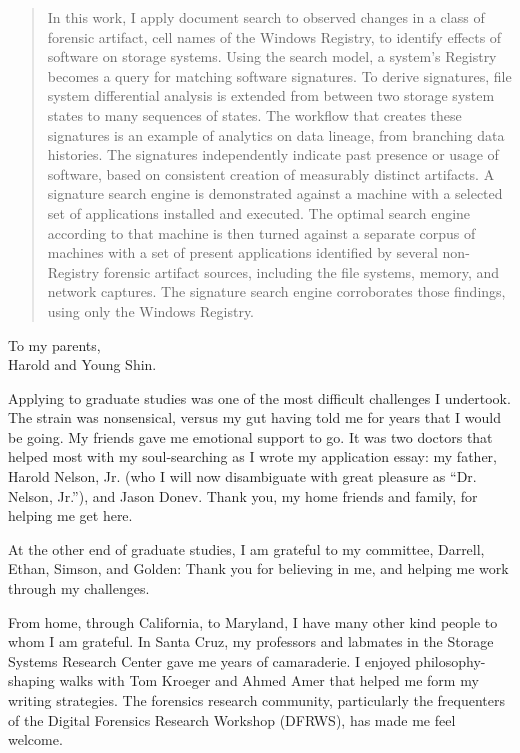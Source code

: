 \documentclass[11pt]{ucthesis}
\theoremstyle{plain}
\theoremstyle{definition}
\begin{document}
\begin{frontmatter}
\begin{abstract}
In this work, I apply document search to observed changes in a class of forensic artifact, cell names of the Windows Registry, to identify effects of software on storage systems.  Using the search model, a system's Registry becomes a query for matching software signatures.  To derive signatures, file system differential analysis is extended from between two storage system states to many sequences of states.  The workflow that creates these signatures is an example of analytics on data lineage, from branching data histories.  The signatures independently indicate past presence or usage of software, based on consistent creation of measurably distinct artifacts.  A signature search engine is demonstrated against a machine with a selected set of applications installed and executed.  The optimal search engine according to that machine is then turned against a separate corpus of machines with a set of present applications identified by several non-Registry forensic artifact sources, including the file systems, memory, and network captures.  The signature search engine corroborates those findings, using only the Windows Registry.
\end{abstract}


\begin{dedication}
\null\vfil
{\large
\begin{center}
To my parents,\\\vspace{12pt}
Harold and Young Shin.
\end{center}}
\vfil\null
\end{dedication}


\begin{acknowledgements}
Applying to graduate studies was one of the most difficult challenges I undertook.  The strain was nonsensical, versus my gut having told me for years that I would be going.  My friends gave me emotional support to go.  It was two doctors that helped most with my soul-searching as I wrote my application essay: my father, Harold Nelson, Jr. (who I will now disambiguate with great pleasure as ``Dr. Nelson, Jr.''), and Jason Donev.  Thank you, my home friends and family, for helping me get here.

At the other end of graduate studies, I am grateful to my committee, Darrell, Ethan, Simson, and Golden: Thank you for believing in me, and helping me work through my challenges.

From home, through California, to Maryland, I have many other kind people to whom I am grateful.  In Santa Cruz, my professors and labmates in the Storage Systems Research Center gave me years of camaraderie.  I enjoyed philosophy-shaping walks with Tom Kroeger and Ahmed Amer that helped me form my writing strategies.  The forensics research community, particularly the frequenters of the Digital Forensics Research Workshop (DFRWS), has made me feel welcome.


\end{acknowledgements}
\end{frontmatter}
\end{document}
